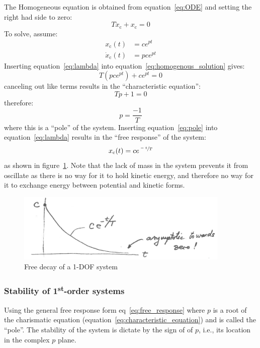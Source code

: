 \documentclass[12pt,letter]{article}
\begin{document}
The Homogeneous equation is obtained from equation~\ref{eq:ODE} and setting the right had side to zero:
\begin{equation}
T\dot{x}_\text{c} + x_\text{c} = 0
\label{eq:homogenous_solution}
\end{equation}
To solve, assume: 
\begin{align}
\label{eq:lambda}
x_\text{c}(t) &= c e^{ p t} \\
\dot{x}_\text{c}(t) &= p c e^{ p t} \nonumber
\end{align}
Inserting equation~\ref{eq:lambda} into equation~\ref{eq:homogenous_solution} gives:
\begin{equation}
T (p c e^{ p t}) + c e^{ p t} = 0
\end{equation}
canceling out like terms results in the ``characteristic equation'':
\begin{equation}
T p  + 1 = 0
\label{eq:characteristic_equation}
\end{equation}
therefore:
\begin{equation}
p  = \frac{-1}{T}
\label{eq:pole}
\end{equation}
where this is a ``pole'' of the system. Inserting equation~\ref{eq:pole} into equation~\ref{eq:lambda} results in the ``free response'' of the system:
\begin{equation}
\label{eq:free_response}
x_\text{c}(t) = c e^{ \sfrac{-t}{T}}
\end{equation}
as shown in figure~\ref{fig:1-DOF_free_decay}. Note that the lack of mass in the system prevents it from oscillate as there is no way for it to hold kinetic energy, and therefore no way for it to exchange energy between potential and kinetic forms. 
\begin{figure}[H]
	\centering
	\includegraphics[width=4in]{../figures/free_decay.png}
	\caption{Free decay of a 1-DOF system}
	\label{fig:1-DOF_free_decay}
\end{figure}

\subsubsection{Stability of 1\textsuperscript{st}-order systems}
Using the general free response form eq~\ref{eq:free_response} where $p$ is a root of the charismatic equation (equation~\ref{eq:characteristic_equation}) and is called the ``pole''. The stability of the system is dictate by the sign of of $p$, i.e., its location in the complex $p$ plane.
\end{document}
